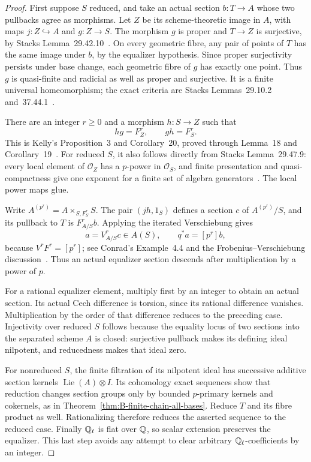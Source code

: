 \begin{proof}
First suppose \(S\) reduced, and take an actual section
\(b:T\to A\) whose two pullbacks agree as morphisms.
Let \(Z\) be its scheme-theoretic image in \(A\), with
maps \(j:Z\hookrightarrow A\) and \(g:Z\to S\).
The morphism \(g\) is proper and \(T\to Z\) is
surjective, by Stacks Lemma~29.42.10~\cite{BStacksProperImage}.
On every geometric fibre, any pair of points of \(T\) has
the same image under \(b\), by the equalizer hypothesis.
Since proper surjectivity persists under base change, each
geometric fibre of \(g\) has exactly one point.  Thus \(g\)
is quasi-finite and radicial as well as proper and surjective.
It is a finite universal homeomorphism; the exact criteria are
Stacks Lemmas~29.10.2 and~37.44.1~\cite{BStacksRadicial,BStacksProperFinite}.

There are an integer \(r\ge0\) and a morphism
\(h:S\to Z\) such that
\[
 h g=F_Z^r,\qquad g h=F_S^r.
\]
This is Kelly's Proposition~3 and Corollary~20, proved through
Lemma~18 and Corollary~19~\cite{BKelly2018}.
For reduced \(S\), it also follows directly from
Stacks Lemma~29.47.9: every local element of \(\mathcal O_Z\)
has a \(p\)-power in \(\mathcal O_S\), and finite
presentation and quasi-compactness give one exponent for a finite
set of algebra generators~\cite{BStacksFrobeniusPower}.
The local power maps glue.

Write
\(A^{(p^r)}=A\times_{S,F_S^r}S\).
The pair \((jh,1_S)\) defines a section \(c\) of
\(A^{(p^r)}/S\), and its pullback to \(T\) is
\(F_{A/S}^r b\).  Applying the iterated Verschiebung gives
\[
 a=V_{A/S}^r c\in A(S),\qquad q^*a=[p^r]b,
\]
because \(V^rF^r=[p^r]\); see Conrad's Example~4.4
and the Frobenius--Verschiebung discussion~\cite{BConrad2006}.
Thus an actual equalizer section descends after multiplication
by a power of \(p\).

For a rational equalizer element, multiply first by an integer
to obtain an actual section.  Its actual Cech difference is
torsion, since its rational difference vanishes.  Multiplication
by the order of that difference reduces to the preceding case.
Injectivity over reduced \(S\) follows because the equality
locus of two sections into the separated scheme \(A\) is
closed: surjective pullback makes its defining ideal nilpotent,
and reducedness makes that ideal zero.

For nonreduced \(S\), the finite filtration of its nilpotent
ideal has successive additive section kernels
\(\operatorname{Lie}(A)\otimes I\).  Its cohomology exact
sequences show that reduction changes section groups only by
bounded \(p\)-primary kernels and cokernels, as in
Theorem~\ref{thm:B-finite-chain-all-bases}.
Reduce \(T\) and its fibre product as well.  Rationalizing
therefore reduces the asserted sequence to the reduced case.
Finally \(\mathbb Q_\ell\) is flat over \(\mathbb Q\), so scalar
extension preserves the equalizer.  This last step avoids any
attempt to clear arbitrary \(\mathbb Q_\ell\)-coefficients by an
integer.
\end{proof}


